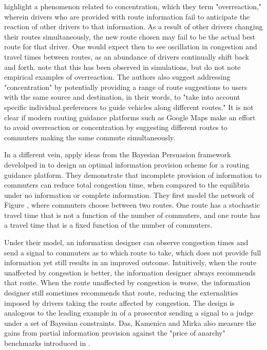 \documentclass[JEL]{AEA}
\begin{document}
\cite{ben-akiva-1991} highlight a phenomenon related to concentration, which they term "overreaction," wherein drivers who are provided with route information fail to anticipate the reaction of other drivers to that information. As a result of other drivers changing their routes simultaneously, the new route chosen may fail to be the actual best route for that driver. One would expect then to see oscillation in congestion and travel times between routes, as an abundance of drivers continually shift back and forth. \cite{ben-akiva-1991} note that this has been observed in simulations, but do not note empirical examples of overreaction. The authors also suggest addressing "concentration" by potentially providing a range of route suggestions to users with the same source and destination, in their words, to "take into account specific individual preferences to guide vehicles along different routes." It is not clear if modern routing guidance platforms such as Google Maps make an effort to avoid overreaction or concentration by suggesting different routes to commuters making the same commute simultaneously.

In a different vein, \cite{das-2017} apply ideas from the Bayesian Persuasion framework develolped in \cite{kamenica-2011} to design an optimal information provision scheme for a routing guidance platform. They demonstrate that incomplete provision of information to commuters can reduce total congestion time, when compared to the equilibria under no information or complete information. They first model the network of Figure \cite{das-fig-1}, where commuters choose between two routes. One route has a stochastic travel time that is not a function of the number of commuters, and one route has a travel time that is a fixed function of the number of commuters. 

Under their model, an information designer can observe congestion times and send a signal to commuters as to which route to take, which does not provide full information yet still results in an improved outcome. Intuitively, when the route unaffected by congestion is better, the information designer always recommends that route. When the route unaffected by congestion is worse, the information designer still sometimes recommends that route, reducing the externalities imposed by drivers taking the route affected by congestion. The design is analogous to the leading example in \cite{kamenica-2011} of a prosecutor sending a signal to a judge under a set of Bayesian constraints. Das, Kamenica and Mirka also measure the gains from partial information provision against the "price of anarchy" benchmarks introduced in \cite{roughgarden-2002}.
\end{document}
